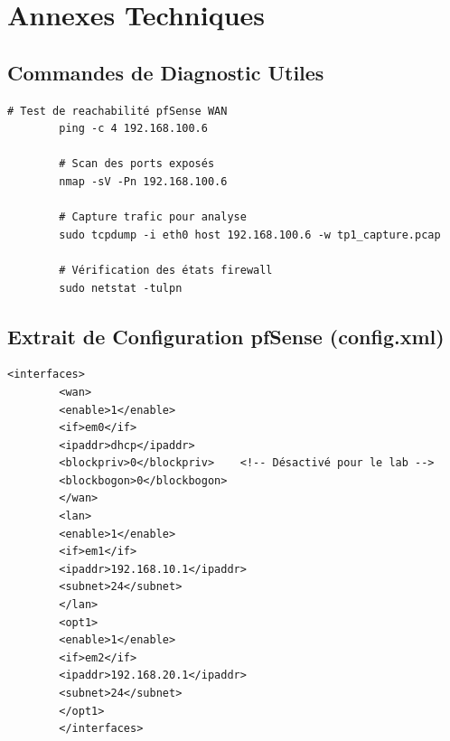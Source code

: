 \documentclass[12pt,a4paper,openany]{report}
\begin{document}
	\appendix
	\chapter{Annexes Techniques}
	
	\section{Commandes de Diagnostic Utiles}
	\begin{lstlisting}[caption=Vérification de connectivité depuis Parrot Security]
		# Test de reachabilité pfSense WAN
		ping -c 4 192.168.100.6
		
		# Scan des ports exposés
		nmap -sV -Pn 192.168.100.6
		
		# Capture trafic pour analyse
		sudo tcpdump -i eth0 host 192.168.100.6 -w tp1_capture.pcap
		
		# Vérification des états firewall
		sudo netstat -tulpn
	\end{lstlisting}
	
	\section{Extrait de Configuration pfSense (config.xml)}
	\begin{lstlisting}[caption=Section Interfaces du fichier de configuration]
		<interfaces>
		<wan>
		<enable>1</enable>
		<if>em0</if>
		<ipaddr>dhcp</ipaddr>
		<blockpriv>0</blockpriv>    <!-- Désactivé pour le lab -->
		<blockbogon>0</blockbogon>
		</wan>
		<lan>
		<enable>1</enable>
		<if>em1</if>
		<ipaddr>192.168.10.1</ipaddr>
		<subnet>24</subnet>
		</lan>
		<opt1>
		<enable>1</enable>
		<if>em2</if>
		<ipaddr>192.168.20.1</ipaddr>
		<subnet>24</subnet>
		</opt1>
		</interfaces>
	\end{lstlisting}
	
\end{document}
